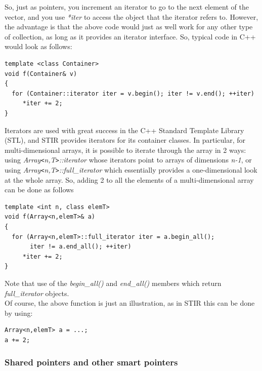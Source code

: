 \documentclass{article}
\begin{document}
So, just as pointers, you increment an iterator to go to the 
next element of the vector, and you use \textit{*iter} to access the 
object that the iterator refers to. However, the advantage is 
that the above code would just as well work for any other type 
of collection, as long as it provides an iterator interface. 
So, typical code in C++ would look as follows:

\begin{verbatim}
template <class Container>
void f(Container& v)
{
  for (Container::iterator iter = v.begin(); iter != v.end(); ++iter)
     *iter += 2;
}
\end{verbatim}


Iterators are used with great success in the C++ Standard Template 
Library (STL), and STIR provides iterators for its container 
classes. In particular, for multi-dimensional arrays, it is possible 
to iterate through the array in 2 ways: using \textit{Array\texttt{<}n,T\texttt{>}::iterator} 
whose iterators point to arrays of dimensions \textit{n-1}, or using \textit{Array\texttt{<}n,T\texttt{>}::full\_iterator} which 
essentially provides a one-dimensional look at the whole array. 
So, adding 2 to all the elements of a multi-dimensional array 
can be done as follows

\begin{verbatim}
template <int n, class elemT>
void f(Array<n,elemT>& a)
{
  for (Array<n,elemT>::full_iterator iter = a.begin_all(); 
       iter != a.end_all(); ++iter)
     *iter += 2;
}
\end{verbatim}

Note that use of the \textit{begin\_all()} and \textit{end\_all()} members 
which return \textit{full\_iterator} objects. \\
Of course, the above function is just an illustration, as in 
STIR this can be done by using:


\begin{verbatim}
Array<n,elemT> a = ...;
a += 2;
\end{verbatim}


\subsubsection{
Shared pointers and other smart pointers \label{sect:sharedptr}}
\end{document}
